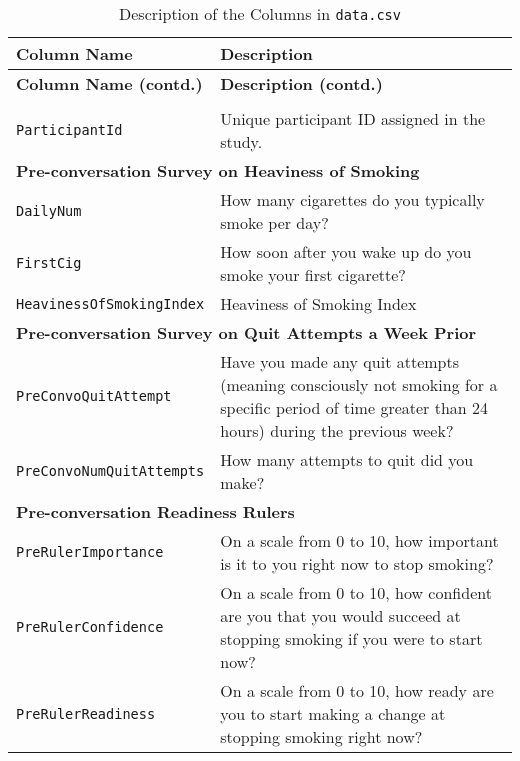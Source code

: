 \begin{longtable}{l p{10cm}}
\caption{Description of the Columns in \texttt{data.csv}}\\

\toprule
\textbf{Column Name} & \textbf{Description}\\
\midrule
\endfirsthead

\toprule
\textbf{Column Name (contd.)} & \textbf{Description (contd.)}\\
\midrule
\endhead


\endfoot

\bottomrule
\endlastfoot

\multicolumn{2}{l}{\textbf{Basic}} \\
\texttt{ParticipantId} & Unique participant ID assigned in the study.\\
\midrule


\multicolumn{2}{l}{\textbf{Pre-conversation Survey on Heaviness of Smoking}} \\
\texttt{DailyNum} & How many cigarettes do you typically smoke per day?\\ 
\texttt{FirstCig} & How soon after you wake up do you smoke your first cigarette?\\
\texttt{HeavinessOfSmokingIndex} & Heaviness of Smoking Index~\citep{heatherton1989measuring}\\
\midrule

\multicolumn{2}{l}{\textbf{Pre-conversation Survey on Quit Attempts a Week Prior}} \\
\texttt{PreConvoQuitAttempt} & Have you made any quit attempts (meaning consciously not smoking for a specific period of time greater than 24 hours) during the previous week?\\
\texttt{PreConvoNumQuitAttempts} & How many attempts to quit did you make?\\
\midrule


\multicolumn{2}{l}{\textbf{Pre-conversation Readiness Rulers}} \\
\texttt{PreRulerImportance} & On a scale from 0 to 10, how important is it to you right now to stop smoking?\\
\texttt{PreRulerConfidence} & On a scale from 0 to 10, how confident are you that you would succeed at stopping smoking if you were to start now?\\
\texttt{PreRulerReadiness} & On a scale from 0 to 10, how ready are you to start making a change at stopping smoking right now?\\
\midrule


\end{longtable}
